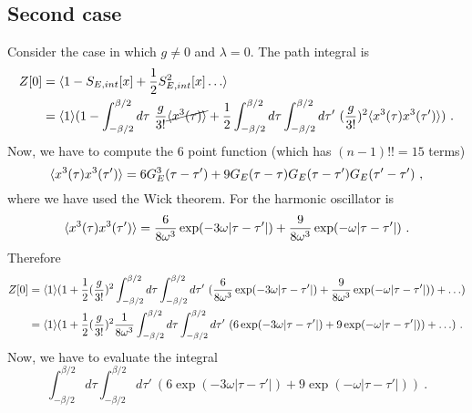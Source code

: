 \subsection{Second case}
    Consider the case in which $g \neq 0$ and $\lambda = 0$. The path integral is 
    \begin{equation*}
    \begin{aligned}
        Z[0] & = \langle1 - S_{E, int} [x] + \frac{1}{2} S^2_{E, int} [x]\ldots\rangle \\ & = \langle1\rangle ( 1 - \int_{- \beta / 2}^{\beta/2} d\tau ~ \frac{g}{3!} \cancel{\langle x^3(\tau)\rangle} + \frac{1}{2} \int_{- \beta / 2}^{\beta/2} d\tau \int_{- \beta / 2}^{\beta/2} d\tau' ~ (\frac{g}{3!})^2 \langle x^3(\tau) x^3(\tau')\rangle) ~.
    \end{aligned}
    \end{equation*} 
    Now, we have to compute the $6$ point function (which has $(n-1)!! = 15$ terms)
    \begin{equation*}
        \langle x^3(\tau) x^3(\tau')\rangle = 6 G_E^3(\tau - \tau') + 9  G_E(\tau - \tau) G_E(\tau - \tau') G_E(\tau' - \tau') ~,
    \end{equation*}
    where we have used the Wick theorem. For the harmonic oscillator is 
    \begin{equation*}
        \langle x^3(\tau) x^3(\tau')\rangle = \frac{6}{8 \omega^3} \exp(- 3 \omega |\tau - \tau'|) + \frac{9}{8 \omega^3} \exp(- \omega |\tau - \tau'|) ~.
    \end{equation*}
    Therefore
    \begin{equation*}
    \begin{aligned}
        Z[0] & = \langle1\rangle ( 1 + \frac{1}{2} (\frac{g}{3!})^2 \int_{- \beta / 2}^{\beta/2} d\tau \int_{- \beta / 2}^{\beta/2} d\tau' ~ (\frac{6}{8 \omega^3} \exp(- 3 \omega |\tau - \tau'|) + \frac{9}{8 \omega^3} \exp(- \omega |\tau - \tau'|)) + \ldots) \\ & = \langle1\rangle ( 1 + \frac{1}{2} (\frac{g}{3!})^2 \frac{1}{8 \omega^3} \int_{- \beta / 2}^{\beta/2} d\tau \int_{- \beta / 2}^{\beta/2} d\tau' ~ (6 \exp(- 3 \omega |\tau - \tau'|) + 9 \exp(- \omega |\tau - \tau'|)) + \ldots) ~.
    \end{aligned}
    \end{equation*}
    Now, we have to evaluate the integral
    \begin{equation*}
        \int_{- \beta / 2}^{\beta/2} d\tau \int_{- \beta / 2}^{\beta/2} d\tau' ~ (6 \exp(- 3 \omega |\tau - \tau'|) + 9 \exp(- \omega |\tau - \tau'|)) ~.
    \end{equation*}
